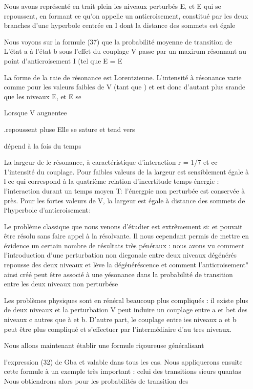 Nous avons représenté en trait plein les niveaux perturbés E, et E qui
se repoussent, en formant ce qu'on appelle un anticroisement, constitué par les
deux branches d'une hyperbole centrée en I dont la distance des sommets est égale


Nous voyons sur la formule (37) que la probabilité moyenne de transition de L'état a à l'état b sous l'effet du couplage V passe par un maxirum
résonnant au point d'anticroisement I (tel que E = E

La forme de la raie de résonance est Lorentzienne. L'intensité à
résonance varie comme  pour les valeurs faibles de V (tant que
) et est donc d'autant plus srande que les niveaux E, et E se

Lorsque V augnentee

.repoussent pluse Elle se sature et tend vers 


dépend à la fois du temps

La largeur de le résonance, à
caractéristique d'interaction r = 1/7 et ce 1'intensité du couplage. Pour 
faibles valeurs de  la largeur  est sensiblement égale à l
ce qui correspond à la quatrième relation d'incertitude temps-énergie : l'interaction
durant un temps moyen T: l'énergpie non perturbée est conservée à
 près. Pour les fortes valeurs de V, la largeur est égale à 
distance des sommets de l‘hyperbole d'anticroisement:

Le problème classique que nous venons d'étudier est extrêmement si:
et pouvait être résolu sans faire appel à la résolvante. Il nous  cependant permis
de mettre en évidence un certain nombre de résultats très pénéraux : nous
avons vu comment l'introduction d'une perturbation non diegonale entre deux niveaux
dégénérés repousse des deux niveaux et lève la dégénéréscence et comment
l'anticroisement" ainsi créé peut être associé à une yésonance dans la probabilité
de transition entre les deux niveaux non perturbése

Les problèmes physiques sont en rénéral beaucoup plus compliqués : il
existe plus de deux niveaux et la perturbation V peut induire un couplage entre
a et bet des niveaux c autres que à et b. D'autre part, le couplage entre ies
niveaux a et b peut être plus compliqué et s'effectuer par l'intermédiaire d'au
tres niveaux.

Nous allons maintenant établir une formule riçoureuse généralisant

l'expression (32) de Gba et valable dans tous les cas. Nous appliquerons ensuite
cette formule à un exemple très important : celui des transitions 
sieurs quantas Nous obtiendrons alors pour les probabilités de transition des

